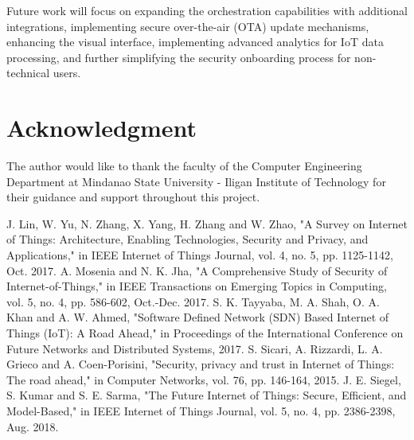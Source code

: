 \documentclass[conference]{IEEEtran}
\begin{document}
Future work will focus on expanding the orchestration capabilities with additional integrations, implementing secure over-the-air (OTA) update mechanisms, enhancing the visual interface, implementing advanced analytics for IoT data processing, and further simplifying the security onboarding process for non-technical users.

\section{Acknowledgment}
The author would like to thank the faculty of the Computer Engineering Department at Mindanao State University - Iligan Institute of Technology for their guidance and support throughout this project.

\begin{thebibliography}{00}
 J. Lin, W. Yu, N. Zhang, X. Yang, H. Zhang and W. Zhao, "A Survey on Internet of Things: Architecture, Enabling Technologies, Security and Privacy, and Applications," in IEEE Internet of Things Journal, vol. 4, no. 5, pp. 1125-1142, Oct. 2017.
 A. Mosenia and N. K. Jha, "A Comprehensive Study of Security of Internet-of-Things," in IEEE Transactions on Emerging Topics in Computing, vol. 5, no. 4, pp. 586-602, Oct.-Dec. 2017.
 S. K. Tayyaba, M. A. Shah, O. A. Khan and A. W. Ahmed, "Software Defined Network (SDN) Based Internet of Things (IoT): A Road Ahead," in Proceedings of the International Conference on Future Networks and Distributed Systems, 2017.
 S. Sicari, A. Rizzardi, L. A. Grieco and A. Coen-Porisini, "Security, privacy and trust in Internet of Things: The road ahead," in Computer Networks, vol. 76, pp. 146-164, 2015.
 J. E. Siegel, S. Kumar and S. E. Sarma, "The Future Internet of Things: Secure, Efficient, and Model-Based," in IEEE Internet of Things Journal, vol. 5, no. 4, pp. 2386-2398, Aug. 2018.
\end{thebibliography}
\end{document}
